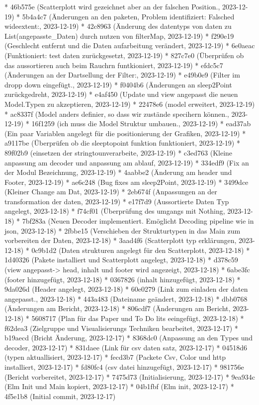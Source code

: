 \documentclass[usegeometry=true]{scrartcl}
\begin{document}
* 46b575e (Scatterplott wird gezeichnet aber an der falschen Position., 2023-12-19)
* 5b4a4c7 (Änderungen an den paketen, Problem identifiziert: Falsched wideextent:, 2023-12-19)
* 42c8963 (Änderung des datentyps von daten zu List(angepasste_Daten) durch nutzen von filterMap, 2023-12-19)
* f290e19 (Geschlecht entfernt und die Daten aufarbeitung verändert, 2023-12-19)
* 6e0aeac (Funktioniert: test daten zurückgesetzt, 2023-12-19)
* 827c7e0 (Überprüfen ob das aussortieren auch beim Rauchrn funtkioniert, 2023-12-19)
* efdc5c7 (Änderungen an der Dartsellung der Filter:, 2023-12-19)
* e49b0e9 (Filter im dropp down eingefügt., 2023-12-19)
* f0404b6 (Änderungen an sleep2Point zurückgedreht, 2023-12-19)
* e4af450 (Update und view angepasst die neuen Model.Typen zu akzeptieren, 2023-12-19)
* 22478e6 (model erweitert, 2023-12-19)
* ac8337f (Model anders definier, so dass wir zustände specihern können., 2023-12-19)
* 16f1259 (ich muss die Model Struktur umbauen., 2023-12-19)
* ead37ab (Ein paar Variablen angelegt für die positionierung der Grafiken, 2023-12-19)
* a9117be (Überprüfen ob die sleeptopoint funktion funktioniert, 2023-12-19)
* 89f02b9 (einsetzen der stringtounverarbeite, 2023-12-19)
* c3ed763 (Kleine anpassung am decoder und anpassung am ablauf, 2023-12-19)
* 334edf9 (Fix an der Modul Bezeichnung, 2023-12-19)
* 4aabbe2 (Änderung am header und Footer, 2023-12-19)
* ae6c248 (Bug fixes am sleep2Point, 2023-12-19)
* 3499dce (Kleiner Change am Dat, 2023-12-19)
* 2eb674f (Anpassungen an der transformation der daten, 2023-12-19)
* e17f7d9 (Aussortierte Daten Typ angelegt, 2023-12-18)
* f74cf01 (Überprüfung des umgangs mit Nothing, 2023-12-18)
* 7bf283a (Neuen Decoder implementiert. Emöglicht Decoding pipeline wie in json, 2023-12-18)
* 2fbbe15 (Verschieben der Strukturtypen in das Main zum vorbereiten der Daten, 2023-12-18)
* 3aad4f6 (Scatterplott typ erklärungen, 2023-12-18)
* 0c9b1d2 (Daten strukturen angelegt für den Scatterplott, 2023-12-18)
* 1d40326 (Pakete installiert und Scatterplott angelegt, 2023-12-18)
* d378c59 (view angepasst-> head, inhalt und footer wird angezeigt, 2023-12-18)
* 6abe3fc (footer hinzugefügt, 2023-12-18)
* 0367826 (inhalt hinzugefügt, 2023-12-18)
* 9da026d (Header angelegt, 2023-12-18)
* 60e0279 (Link zum einladen der daten angepasst., 2023-12-18)
* 443a483 (Dateiname geändert, 2023-12-18)
* dbb0768 (Änderungen am Bericht, 2023-12-18)
* 806cdf7 (Änderungen am Bericht, 2023-12-18)
* 5608717 (Plan für das Paper und To Do lits eeingefügt, 2023-12-18)
* f62dea3 (Zielgruppe und Visualisierungs Techniken bearbeitet, 2023-12-17)
* b19aecd (Bricht Änderung, 2023-12-17)
* 8368dc0 (Anpassung an den Types und decoder, 2023-12-17)
* 831daee (Link für csv daten satz, 2023-12-17)
* 04518d6 (typen aktuallisiert, 2023-12-17)
* fecd3b7 (Packete Csv, Color und http installiert, 2023-12-17)
* fd80fc4 (csv datei hinzugefügt, 2023-12-17)
* 981756e (Bericht vorbereitet, 2023-12-17)
* 7475d73 (Initialisierung, 2023-12-17)
* 9ea934c (Elm Init und Main kopiert, 2023-12-17)
* 04b1fbf (Elm init, 2023-12-17)
* 4f5e1b8 (Initial commit, 2023-12-17)

\printbibliography
\end{document}
